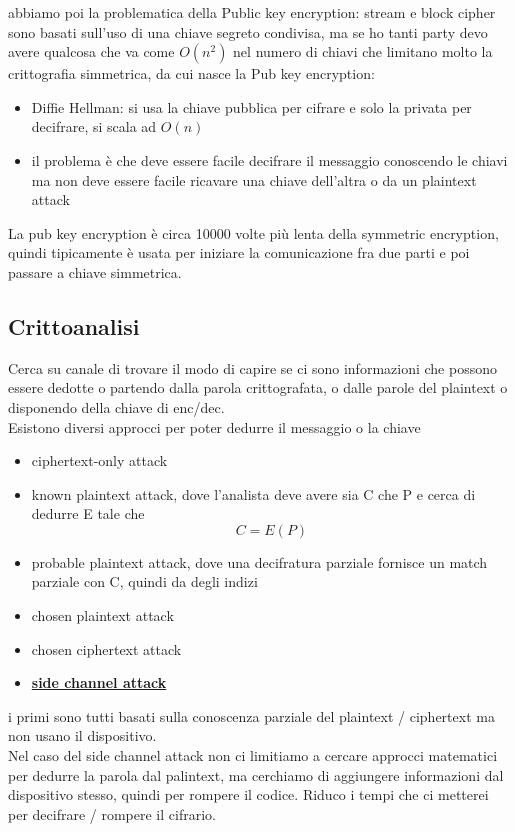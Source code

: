 \documentclass[oneside, 12pt]{extbook}
\begin{document}
abbiamo poi la problematica della Public key encryption: stream e block cipher sono basati sull'uso di una chiave segreto condivisa, ma se ho tanti party devo avere qualcosa che va come $O(n^2)$ nel numero di chiavi che limitano molto la crittografia simmetrica, da cui nasce la Pub key encryption:
\begin{itemize}
	\item Diffie Hellman: si usa la chiave pubblica per cifrare e solo la privata per decifrare, si scala ad $O(n)$
	\item il problema è che deve essere facile decifrare il messaggio conoscendo le chiavi ma non deve essere facile ricavare una chiave dell'altra o da un plaintext attack
\end{itemize}
La pub key encryption è circa 10000 volte più lenta della symmetric encryption, quindi tipicamente è usata per iniziare la comunicazione fra due parti e poi passare a chiave simmetrica.

\subsection{Crittoanalisi}
Cerca su canale di trovare il modo di capire se ci sono informazioni che possono essere dedotte o partendo dalla parola crittografata, o dalle parole del plaintext o disponendo della chiave di enc/dec.\\Esistono diversi approcci per poter dedurre il messaggio o la chiave
\begin{itemize}
	\item ciphertext-only attack
	\item known plaintext attack, dove l'analista deve avere sia C che P e cerca di dedurre E tale che
	\begin{equation}
		C = E(P)
	\end{equation}
	\item probable plaintext attack, dove una decifratura parziale fornisce un match parziale con C, quindi da degli indizi
	\item chosen plaintext attack
	\item chosen ciphertext attack
	\item \underline{\textbf{side channel attack}}
\end{itemize}
i primi sono tutti basati sulla conoscenza parziale del plaintext / ciphertext ma non usano il dispositivo.\\Nel caso del side channel attack non ci limitiamo a cercare approcci matematici per dedurre la parola dal palintext, ma cerchiamo di aggiungere informazioni dal dispositivo stesso, quindi per rompere il codice. Riduco i tempi che ci metterei per decifrare / rompere il cifrario.
\end{document}
